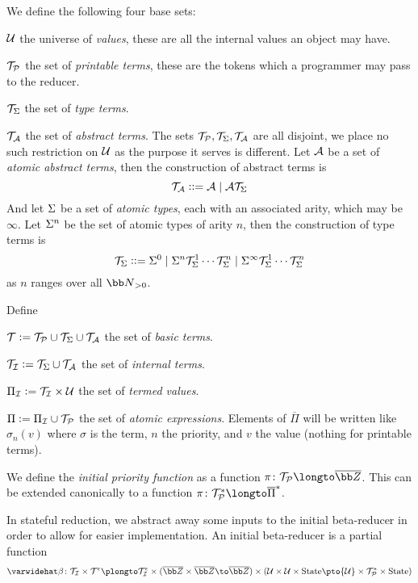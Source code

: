 \noindent We define the following four base sets:
\benum
    \item ${\cal U}$ the universe of {\it values}, these are all the internal values an object may have.
    \item ${\cal T}_{\cal P}$ the set of {\it printable terms}, these are the tokens which a programmer may pass to the reducer.
    \item ${\cal T}_{\Sigma}$ the set of {\it type terms}.
    \item ${\cal T}_{\cal A}$ the set of {\it abstract terms}.
\eenum
The sets ${\cal T}_{\cal P},{\cal T}_\Sigma,{\cal T}_{\cal A}$ are all disjoint, we place no such restriction on ${\cal U}$ as the purpose it serves is different.
Let ${\cal A}$ be a set of {\it atomic abstract terms}, then the construction of abstract terms is
$$ {\cal T}_{\cal A} \mathrel{{\mathop:}{\mathop:}{=}} {\cal A}\mid{\cal A}{\cal T}_\Sigma $$
And let $\Sigma$ be a set of {\it atomic types}, each with an associated arity, which may be $\infty$.
Let $\Sigma^n$ be the set of atomic types of arity $n$, then the construction of type terms is
$$ {\cal T}_\Sigma \mathrel{{\mathop:}{\mathop:}{=}} \Sigma^0 \mid \Sigma^n{\cal T}_\Sigma^1\cdots{\cal T}_\Sigma^n\mid\Sigma^\infty{\cal T}_\Sigma^1\cdots{\cal T}_\Sigma^n $$
as $n$ ranges over all ${\bb N}_{>0}$.

Define
\benum
    \item ${\cal T}\mathrel{{\mathop:}{=}}{\cal T}_{\cal P}\cup{\cal T}_\Sigma\cup{\cal T}_{\cal A}$ the set of {\it basic terms}.
    \item ${\cal T}_{\cal I}\mathrel{{\mathop:}{=}}{\cal T}_\Sigma\cup{\cal T}_{\cal A}$ the set of {\it internal terms}.
    \item $\Pi_{\cal I}\mathrel{{\mathop:}{=}}{\cal T}_{\cal I}\times{\cal U}$ the set of {\it termed values}.
    \item $\Pi\mathrel{{\mathop:}{=}}\Pi_{\cal I}\cup{\cal T}_{\cal P}$ the set of {\it atomic expressions}.
\eenum
Elements of $\overline\Pi$ will be written like $\sigma_n(v)$ where $\sigma$ is the term, $n$ the priority, and $v$ the value (nothing for printable terms).

We define the {\it initial priority function} as a function $\pi\colon\term_{\cal P}\longto\overline{\bb Z}$.
This can be extended canonically to a function $\pi\colon\term_{\cal P}^*\longto\overline{\Pi}^*$.

In stateful reduction, we abstract away some inputs to the initial beta-reducer in order to allow for easier implementation.
An initial beta-reducer is a partial function
$$ \varwidehat\beta\colon \term_{\cal I}\times\term^\epsilon\plongto\term_{\cal I}^\epsilon\times(\overline{\bb Z}\times\overline{\bb Z}\to\overline{\bb Z})\times
({\cal U}\times{\cal U}\times{\rm State}\pto{\cal U}\times\term_{\cal P}^*\times{\rm State}) $$

